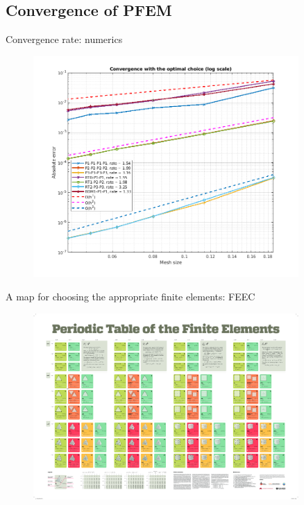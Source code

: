 \documentclass[10pt,aspectratio=43]{ISAE-Beamer}
\begin{document}
\subsection{Convergence of PFEM}



\begin{frame}{Convergence rate: numerics}
	\begin{figure}
		\centering
		\includegraphics[width=0.9\textwidth]{CVoptimal}
	\end{figure}
	
	
\end{frame}

\begin{frame}{\small A map for choosing the appropriate finite elements: FEEC}
	\begin{figure}
		\centering
		\includegraphics[width=0.9\textwidth]{FenicsFEM}
		
	\end{figure}
\end{frame}
\end{document}
